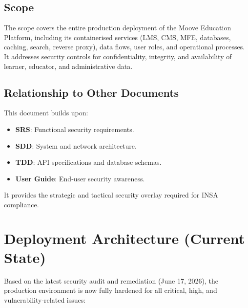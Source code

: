 \subsection{Scope}
The scope covers the entire production deployment of the Moove Education Platform, including its containerised services (LMS, CMS, MFE, databases, caching, search, reverse proxy), data flows, user roles, and operational processes. It addresses security controls for confidentiality, integrity, and availability of learner, educator, and administrative data.

\subsection{Relationship to Other Documents}
This document builds upon:
\begin{itemize}
    \item \textbf{SRS}: Functional security requirements.
    \item \textbf{SDD}: System and network architecture.
    \item \textbf{TDD}: API specifications and database schemas.
    \item \textbf{User Guide}: End‑user security awareness.
\end{itemize}
It provides the strategic and tactical security overlay required for INSA compliance.

\section{Deployment Architecture (Current State)}

Based on the latest security audit and remediation (June 17, 2026), the production environment is now fully hardened for all critical, high, and vulnerability-related issues:

